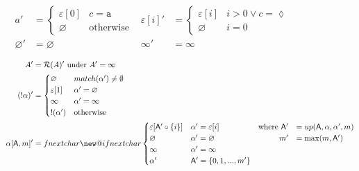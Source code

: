 \documentclass[submission,copyright,creativecommons]{eptcs}
\makeatletter
\newcommand{\Rule}{\mathcal{R}}
\newcommand{\chs}[1]{\mathtt{#1}}
\newcommand{\eos}{\lozenge}
\newcommand{\g}[1]{\mathsf{#1}}
\newcommand{\of}[2]{#1 \circ #2}
\newcommand{\upd}{up}
\newenvironment{mcases}[1][l]
 {\let\@ifnextchar\new@ifnextchar
  \left\lbrace
  \def\arraystretch{1.2}\array{@{}l@{\quad}#1@{}}}
 {\endarray\right.}
\makeatother
\begin{document}
\begin{table*}
\centering
\begin{subfigure}[t]{\textwidth}
\begin{align*}
a'                           & = \begin{cases} \varepsilon[0] & c = \chs{a} \\
                                               \varnothing    & \text{otherwise} \end{cases} &
\varepsilon[i]'              & = \begin{cases} \varepsilon[i] & i > 0 \lor c = \eos \\
                                               \varnothing    & i = 0 \end{cases} \\
\varnothing'                 & = \varnothing &
\infty'                      & = \infty
\end{align*}
\end{subfigure}
\begin{subfigure}[t]{\textwidth}
\begin{align*}
A'                           & = \Rule(A)' \text{ under } A' = \infty \\
(!\alpha)'                   & = \begin{cases} \varnothing    & match(\alpha') \neq \emptyset \\
                                               \varepsilon[1] & \alpha' = \varnothing \\
                                               \infty         & \alpha' = \infty \\
                                               !(\alpha')     & \text{otherwise} \end{cases} \\
\alpha[\g{A},m]'             & = \begin{mcases}[lrl] \varepsilon[\of{\g{A}'}{\{i\}}] & \alpha' = \varepsilon[i] & \text{where}~\g{A}' & = \upd(\g{A},\alpha,\alpha',m) \\
                                                     \varnothing                     & \alpha' = \varnothing    &                  m' & = \max(m, \g{A}') \\
                                                     \infty                          & \alpha' = \infty & & \\
                                                     \alpha'                         & \g{A}' = \{0,1,...,m'\} & & \\

\end{mcases}
\end{align*}
\end{subfigure}
\end{table*}
\end{document}
